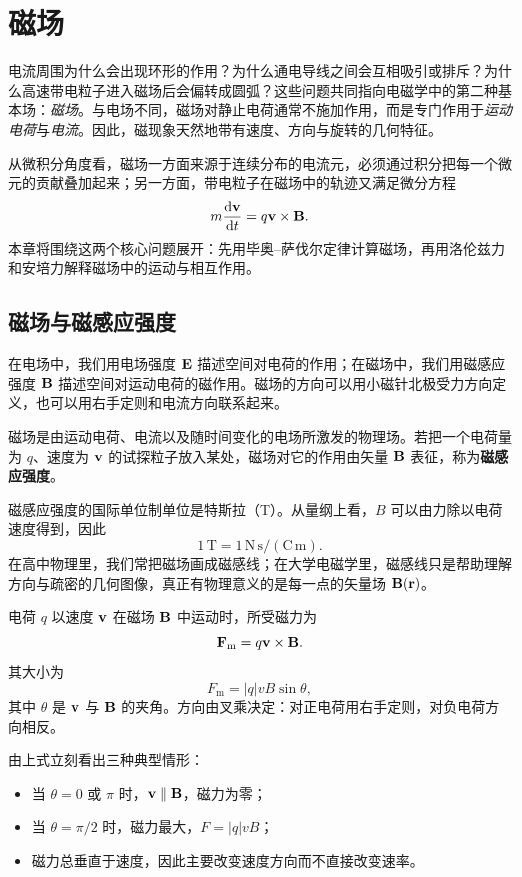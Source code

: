 \chapter{磁场}

电流周围为什么会出现环形的作用？为什么通电导线之间会互相吸引或排斥？为什么高速带电粒子进入磁场后会偏转成圆弧？这些问题共同指向电磁学中的第二种基本场：\emph{磁场}。与电场不同，磁场对静止电荷通常不施加作用，而是专门作用于\emph{运动电荷}与\emph{电流}。因此，磁现象天然地带有速度、方向与旋转的几何特征。

从微积分角度看，磁场一方面来源于连续分布的电流元，必须通过积分把每一个微元的贡献叠加起来；另一方面，带电粒子在磁场中的轨迹又满足微分方程
\[
  m\dv{\vb{v}}{t}=q\vb{v}\times\vb{B}.
\]
本章将围绕这两个核心问题展开：先用毕奥--萨伐尔定律计算磁场，再用洛伦兹力和安培力解释磁场中的运动与相互作用。

\section{磁场与磁感应强度}

在电场中，我们用电场强度 $\vb{E}$ 描述空间对电荷的作用；在磁场中，我们用磁感应强度 $\vb{B}$ 描述空间对运动电荷的磁作用。磁场的方向可以用小磁针北极受力方向定义，也可以用右手定则和电流方向联系起来。

\begin{definition}
磁场是由运动电荷、电流以及随时间变化的电场所激发的物理场。若把一个电荷量为 $q$、速度为 $\vb{v}$ 的试探粒子放入某处，磁场对它的作用由矢量 $\vb{B}$ 表征，称为\textbf{磁感应强度}。
\end{definition}

磁感应强度的国际单位制单位是特斯拉（T）。从量纲上看，$B$ 可以由力除以电荷速度得到，因此
\[
  1\,\mathrm{T}=1\,\mathrm{N\,s/(C\,m)}.
\]
在高中物理里，我们常把磁场画成磁感线；在大学电磁学里，磁感线只是帮助理解方向与疏密的几何图像，真正有物理意义的是每一点的矢量场 $\vb{B}(\vb{r})$。

\begin{law}[洛伦兹力]
电荷 $q$ 以速度 $\vb{v}$ 在磁场 $\vb{B}$ 中运动时，所受磁力为
\[
  \vb{F}_\mathrm{m}=q\vb{v}\times\vb{B}.
\]
其大小为
\[
  F_\mathrm{m}=|q|vB\sin\theta,
\]
其中 $\theta$ 是 $\vb{v}$ 与 $\vb{B}$ 的夹角。方向由叉乘决定：对正电荷用右手定则，对负电荷方向相反。
\end{law}

由上式立刻看出三种典型情形：
\begin{itemize}
  \item 当 $\theta=0$ 或 $\pi$ 时，$\vb{v}\parallel\vb{B}$，磁力为零；
  \item 当 $\theta=\pi/2$ 时，磁力最大，$F=|q|vB$；
  \item 磁力总垂直于速度，因此主要改变速度方向而不直接改变速率。
\end{itemize}

